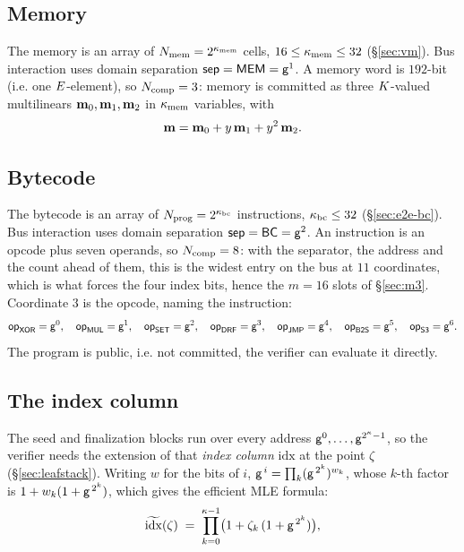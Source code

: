 \subsection{Memory}\label{sec:memchan}

The memory is an array of $N_{\mathrm{mem}} = 2^{\kappa_{\mathrm{mem}}}$ cells, $16\le\kappa_{\mathrm{mem}}\le32$ (\S\ref{sec:vm}). Bus interaction uses domain separation $\mathsf{sep}=\mathsf{MEM} = \mathsf{g}^{1}$. A memory word is $192$-bit (i.e. one $E$-element), so $N_{\mathrm{comp}}=3$: memory is committed as three $K$-valued multilinears $\mathbf{m}_0,\mathbf{m}_1,\mathbf{m}_2$ in $\kappa_{\mathrm{mem}}$ variables, with
\[
  \mathbf{m}=\mathbf{m}_0+y\,\mathbf{m}_1+y^2\,\mathbf{m}_2 .
\]

\subsection{Bytecode}\label{sec:bytecode}

The bytecode is an array of $N_{\mathrm{prog}} = 2^{\kappa_{\mathrm{bc}}}$ instructions, $\kappa_{\mathrm{bc}} \le 32$ (\S\ref{sec:e2e-bc}). Bus interaction uses domain separation $\mathsf{sep}=\mathsf{BC} = \mathsf{g}^{2}$. An instruction is an opcode plus seven operands, so $N_{\mathrm{comp}}=8$: with the separator, the address and the count ahead of them, this is the widest entry on the bus at $11$ coordinates, which is what forces the four index bits, hence the $m=16$ slots of \S\ref{sec:m3}. Coordinate $3$ is the opcode, naming the instruction:
\[
  \mathsf{op}_{\mathsf{XOR}}=\mathsf{g}^{0},\quad \mathsf{op}_{\mathsf{MUL}}=\mathsf{g}^{1},\quad \mathsf{op}_{\mathsf{SET}}=\mathsf{g}^{2},\quad \mathsf{op}_{\mathsf{DRF}}=\mathsf{g}^{3},\quad \mathsf{op}_{\mathsf{JMP}}=\mathsf{g}^{4},\quad \mathsf{op}_{\mathsf{B2S}}=\mathsf{g}^{5},\quad \mathsf{op}_{\mathsf{S3}}=\mathsf{g}^{6}.
\] The program is public, i.e. not committed, the verifier can evaluate it directly.

\subsection{The index column}\label{sec:idxcol}

The seed and finalization blocks run over every address $\mathsf{g}^{0},\dots,\mathsf{g}^{2^{\kappa}-1}$, so the verifier needs the extension of that \emph{index column} $\mathrm{idx}$ at the point $\zeta$ (\S\ref{sec:leafstack}). Writing $w$ for the bits of $i$, $\mathsf{g}^{\,i}=\prod_k(\mathsf{g}^{\,2^{k}})^{w_k}$, whose $k$-th factor is $1+w_k(1+\mathsf{g}^{\,2^{k}})$, which gives the efficient MLE formula:
\[
  \widetilde{\mathrm{idx}}(\zeta)\;=\;\prod_{k=0}^{\kappa-1}\bigl(1+\zeta_k\,(1+\mathsf{g}^{\,2^{k}})\bigr),
\]
